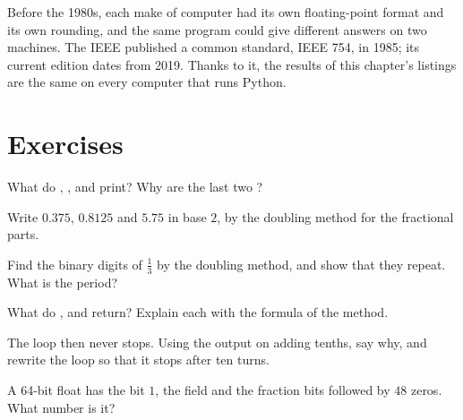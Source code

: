 \begin{history}
Before the 1980s, each make of computer had its own floating-point format and its own rounding, and the same
program could give different answers on two machines. The IEEE published a common standard, IEEE 754, in 1985; its
current edition dates from 2019. Thanks to it, the results of this chapter's listings are the same on every computer
that runs Python.
\end{history}

\section{Exercises}\label{sec:g10:floating-point:exercises}

\begin{exercise}[$\star$]\label{exo:g10:floating-point:1}
What do , ,  and  print? Why are
the last two ?
\end{exercise}

\begin{exercise}[$\star$]\label{exo:g10:floating-point:2}
Write $0.375$, $0.8125$ and $5.75$ in base $2$, by the doubling method for the fractional parts.
\end{exercise}

\begin{exercise}[$\star$]\label{exo:g10:floating-point:3}
Find the binary digits of $\tfrac13$ by the doubling method, and show that they repeat. What is the period?
\end{exercise}

\begin{exercise}[$\star$]\label{exo:g10:floating-point:4}
What do ,  and
 return? Explain each with the formula of the method.
\end{exercise}

\begin{exercise}[$\star$]\label{exo:g10:floating-point:5}
The loop  then  never stops. Using the output on adding tenths, say
why, and rewrite the loop so that it stops after ten turns.
\end{exercise}

\begin{exercise}[$\star\star$]\label{exo:g10:floating-point:6}
A 64-bit float has the  bit $1$, the  field  and the fraction bits  followed by
$48$ zeros. What number is it?
\end{exercise}


